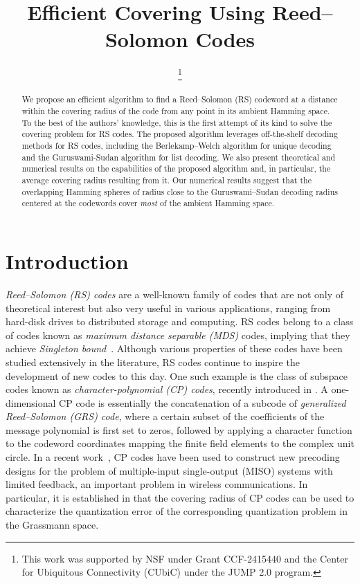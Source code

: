 \documentclass[conference]{IEEEtran}
\title{Efficient Covering Using Reed--Solomon Codes}
\author{\IEEEauthorblockN{Samin Riasat and Hessam Mahdavifar} 
\IEEEauthorblockA{Department of Electrical and Computer Engineering, Northeastern University, Boston, MA 02115, USA \\ 
Email: \{%
\href{mailto:riasat.s@northeastern.edu}{riasat.s}, \href{mailto:h.mahdavifar@northeastern.edu}{h.mahdavifar}\}@northeastern.edu}
\thanks{This work was supported by NSF under Grant CCF-2415440 and the Center for Ubiquitous Connectivity (CUbiC) under the JUMP 2.0 program.}

}
\date{}
\begin{document}
\maketitle

\begin{abstract}
    We propose an efficient algorithm to find a Reed--Solomon (RS) codeword at a distance within the covering radius of the code from any point in its ambient Hamming space. To the best of the authors' knowledge, this is the first attempt of its kind to solve the covering problem for RS codes. The proposed algorithm leverages off-the-shelf decoding methods for RS codes, including the Berlekamp–Welch algorithm for unique decoding and the Guruswami-Sudan algorithm for list decoding. We also present theoretical and numerical results on the capabilities of the proposed algorithm and, in particular, the average covering radius resulting from it. Our numerical results suggest that the overlapping Hamming spheres of radius close to the Guruswami--Sudan decoding radius centered at the codewords cover \textit{most} of the ambient Hamming space. 
\end{abstract}

\section{Introduction}
\label{sec:intro}

\emph{Reed--Solomon (RS) codes} are a well-known family of codes that are not only of theoretical interest but also very useful in various applications, ranging from hard-disk drives to distributed storage and computing. 
RS codes belong to a class of codes known as \emph{maximum distance separable (MDS)} codes, implying that they achieve \emph{Singleton bound}~\cite{Huffman03}. 
Although various properties of these codes have been studied extensively in the literature, RS codes continue to inspire the development of new codes to this day. One such example is the class of subspace codes known as \emph{character-polynomial (CP) codes}, recently introduced in \cite{Hessam22, Hessam21}. A one-dimensional CP code is essentially the concatenation of a subcode of \emph{generalized Reed--Solomon (GRS) code}, where a certain subset of the coefficients of the message polynomial is first set to zeros, followed by applying a character function to the codeword coordinates mapping the finite field elements to the complex unit circle. In a recent work~\cite{gooty2025precodingdesignlimitedfeedbackmiso}, CP codes have been used to construct new precoding designs for the problem of multiple-input single-output (MISO) systems with limited feedback, an important problem in wireless communications. In particular, it is established in \cite{gooty2025precodingdesignlimitedfeedbackmiso} that the covering radius of CP codes can be used to characterize the quantization error of the corresponding quantization problem in the Grassmann space. 
\end{document}
